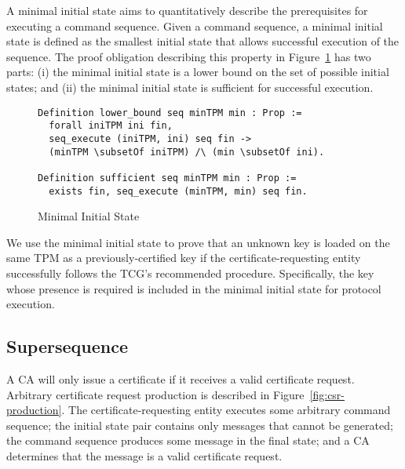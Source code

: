 \documentclass[runningheads]{llncs}
\begin{document}
A minimal initial state aims to quantitatively describe the
prerequisites for executing a command sequence.  Given a command
sequence, a minimal initial state is defined as the smallest initial
state that allows successful execution of the sequence. The proof
obligation describing this property in
Figure~\ref{fig:minimal-initial-state} has two parts: (i) the minimal
initial state is a lower bound on the set of possible initial states;
and (ii) the minimal initial state is sufficient for successful
execution.

\begin{figure}[hbtp]
\vspace{-\medskipamount}
\vspace{-\medskipamount}
\begin{lstlisting}[language=Coq]
Definition lower_bound seq minTPM min : Prop :=
  forall iniTPM ini fin,
  seq_execute (iniTPM, ini) seq fin ->
  (minTPM \subsetOf iniTPM) /\ (min \subsetOf ini).

Definition sufficient seq minTPM min : Prop :=
  exists fin, seq_execute (minTPM, min) seq fin.
\end{lstlisting}
\caption{Minimal Initial State}
\label{fig:minimal-initial-state}
\end{figure}

We use the minimal initial state to prove that an unknown key is
loaded on the same TPM as a previously-certified key if the
certificate-requesting entity successfully follows the TCG's
recommended procedure.  Specifically, the key whose presence is
required is included in the minimal initial state for protocol
execution.

\subsection{Supersequence}

A CA will only issue a certificate if it receives a valid certificate
request.  Arbitrary certificate request production is described in
Figure~\ref{fig:csr-production}. The certificate-requesting
entity executes some arbitrary command sequence; the initial state
pair contains only messages that cannot be generated; the command
sequence produces some message in the final state; and a CA determines
that the message is a valid certificate request.

\end{document}
